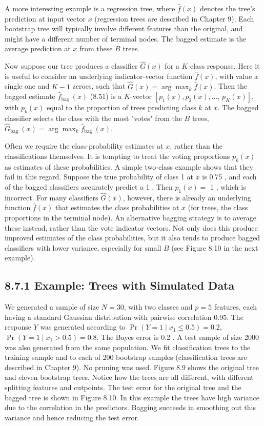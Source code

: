 \documentclass[10pt]{article}
\begin{document}
A more interesting example is a regression tree, where $\hat{f}(x)$ denotes the tree's prediction at input vector $x$ (regression trees are described in Chapter 9). Each bootstrap tree will typically involve different features than the original, and might have a different number of terminal nodes. The bagged estimate is the average prediction at $x$ from these $B$ trees.

Now suppose our tree produces a classifier $\hat{G}(x)$ for a $K$-class response. Here it is useful to consider an underlying indicator-vector function $\hat{f}(x)$, with value a single one and $K-1$ zeroes, such that $\hat{G}(x)=\arg \max _{k} \hat{f}(x)$. Then the bagged estimate $\hat{f}_{\text {bag }}(x)$ (8.51) is a $K$-vector $\left[p_{1}(x), p_{2}(x), \ldots\right.$, $\left.p_{K}(x)\right]$, with $p_{k}(x)$ equal to the proportion of trees predicting class $k$ at $x$. The bagged classifier selects the class with the most "votes" from the $B$ trees, $\hat{G}_{\text {bag }}(x)=\arg \max _{k} \hat{f}_{\text {bag }}(x)$.

Often we require the class-probability estimates at $x$, rather than the classifications themselves. It is tempting to treat the voting proportions $p_{k}(x)$ as estimates of these probabilities. A simple two-class example shows that they fail in this regard. Suppose the true probability of class 1 at $x$ is 0.75 , and each of the bagged classifiers accurately predict a 1 . Then $p_{1}(x)=$ 1 , which is incorrect. For many classifiers $\hat{G}(x)$, however, there is already an underlying function $\hat{f}(x)$ that estimates the class probabilities at $x$ (for trees, the class proportions in the terminal node). An alternative bagging strategy is to average these instead, rather than the vote indicator vectors. Not only does this produce improved estimates of the class probabilities, but it also tends to produce bagged classifiers with lower variance, especially for small $B$ (see Figure 8.10 in the next example).

\subsection*{8.7.1 Example: Trees with Simulated Data}
We generated a sample of size $N=30$, with two classes and $p=5$ features, each having a standard Gaussian distribution with pairwise correlation 0.95. The response $Y$ was generated according to $\operatorname{Pr}\left(Y=1 \mid x_{1} \leq 0.5\right)=0.2$, $\operatorname{Pr}\left(Y=1 \mid x_{1}>0.5\right)=0.8$. The Bayes error is 0.2 . A test sample of size 2000 was also generated from the same population. We fit classification trees to the training sample and to each of 200 bootstrap samples (classification trees are described in Chapter 9). No pruning was used. Figure 8.9 shows the original tree and eleven bootstrap trees. Notice how the trees are all different, with different splitting features and cutpoints. The test error for the original tree and the bagged tree is shown in Figure 8.10. In this example the trees have high variance due to the correlation in the predictors. Bagging succeeds in smoothing out this variance and hence reducing the test error.
\end{document}
